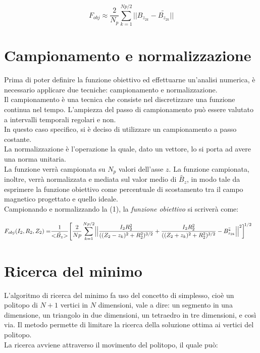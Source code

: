 \documentclass[a4paper, 11pt]{article}
\begin{document}
\[F_{obj} \approx \frac{2}{N_{p}}\sum\limits_{k=1}^{Np/2} ||B_{z_{2k}}-\tilde{B_{z_{2k}}}||\]

\section*{Campionamento e normalizzazione}

Prima di poter definire la funzione obiettivo ed effettuarne un'analisi
numerica, è necessario applicare due tecniche: campionamento e normalizzazione.
\\
Il campionamento è una tecnica che consiste nel discretizzare una funzione
continua nel tempo. L'ampiezza del passo di campionamento può essere valutato a
intervalli temporali regolari e non. \\
In questo caso specifico, si è deciso di utilizzare un campionamento a passo
costante. \\
La normalizzazione è l'operazione la quale, dato un vettore, lo si porta ad
avere una norma unitaria. \\
La funzione verrà campionata su $N_{p}$ valori dell'asse $z$. La funzione
campionata, inoltre, verrà normalizzata e mediata sul valor medio di
$\tilde{B_{z}}$, in modo tale da esprimere la funzione obiettivo come
percentuale di scostamento tra il campo magnetico progettato e quello ideale. \\
Campionando e normalizzando la (1), la \emph{funzione obiettivo} si scriverà
come:
 
\begin{equation}
    \begin{split}
        F_{obj}(I_{2},R_{2},Z_{2}) =
        & \frac{1}{{\tiny <} \tilde{B_{z}}{\tiny >}} \Biggl[ \frac{2}{Np} \sum\limits_{k=1}^{Np/2} \Bigl|\Bigl|\frac{I_{2}R_{2}^{2}}{((Z_{2}-z_{k})^{2}+R_{2}^{2})^{3/2}}+\frac{I_{2}R_{2}^{2}}{((Z_{2}+z_{k})^{2}+R_{2}^{2})^{3/2}}-\tilde{B^*_{z_{2k}}}\Bigr|\Bigr|^{2}\biggr]^{\!1/2}
    \end{split} 
\end{equation}
\noindent

\section* {Ricerca del minimo}

L'algoritmo di ricerca del minimo fa uso del concetto di simplesso, cioè un
politopo di $N+1$ vertici in $N$ dimensioni, vale a dire: un segmento in una
dimensione, un triangolo in due dimensioni, un tetraedro in tre dimensioni, e
così via. Il metodo permette di limitare la ricerca della soluzione ottima ai
vertici del politopo. \\
La ricerca avviene attraverso il movimento del politopo, il quale può:
\end{document}
